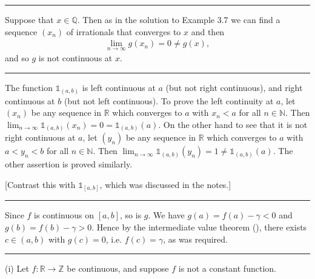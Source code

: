 \documentclass[letterpaper,10pt,english]{jupyterBook}
\begin{document}
\bigskip\hrule\bigskip


\sphinxAtStartPar
{\hyperref[\detokenize{Problems:id22}]{}} Suppose that \(x \in \mathbb{Q}\). Then as in the solution to Example 3.7 we can find a sequence \((x_{n})\) of irrationals that converges to \(x\) and then
\begin{equation*}
\begin{split}
\lim_{n\rightarrow\infty} g(x_{n}) = 0 \neq g(x),
\end{split}
\end{equation*}
\sphinxAtStartPar
and so \(g\) is not continuous at \(x\).


\bigskip\hrule\bigskip


\sphinxAtStartPar
{\hyperref[\detokenize{Problems:id23}]{}}

The function \(\mathbb{1}_{(a, b)}\) is left continuous at \(a\) (but not right continuous), and right continuous at \(b\) (but not left continuous).
To prove the left continuity at \(a\), let \((x_{n})\) be any sequence in \(\mathbb{R}\) which converges to \(a\) with \(x_{n} < a\) for all \(n\in\mathbb{N}\). Then \(\lim_{n\rightarrow\infty} \mathbb{1}_{(a, b)}(x_{n}) = 0 = \mathbb{1}_{(a, b)}(a).\) On the other hand to see that it is not right continuous at \(a\), let \((y_{n})\) be any sequence in \(\mathbb{R}\) which converges to \(a\) with \(a < y_{n} < b\) for all \(n\in\mathbb{N}\). Then
\( \lim_{n\rightarrow\infty} \mathbb{1}_{(a, b)}(y_{n}) = 1 \neq \mathbb{1}_{(a, b)}(a). \) The other assertion is proved similarly.

{[}Contrast this with \(\mathbb{1}_{[a, b]}\), which was discussed in the notes.{]}


\bigskip\hrule\bigskip


\sphinxAtStartPar
{\hyperref[\detokenize{Problems:id24}]{}} Since \(f\) is continuous on \([a, b]\), so is \(g\). We have \(g(a) = f(a) - \gamma < 0\) and \(g(b) = f(b) - \gamma > 0\). Hence by the intermediate value theorem (), there exists \(c \in (a, b)\) with \(g(c) = 0\), i.e. \(f(c) = \gamma\), as was required.


\bigskip\hrule\bigskip


\sphinxAtStartPar
{\hyperref[\detokenize{Problems:id25}]{}}
(i) Let \(f:\mathbb{R}\to\mathbb{Z}\) be continuous, and suppose \(f\) is not a constant function.
\end{document}
